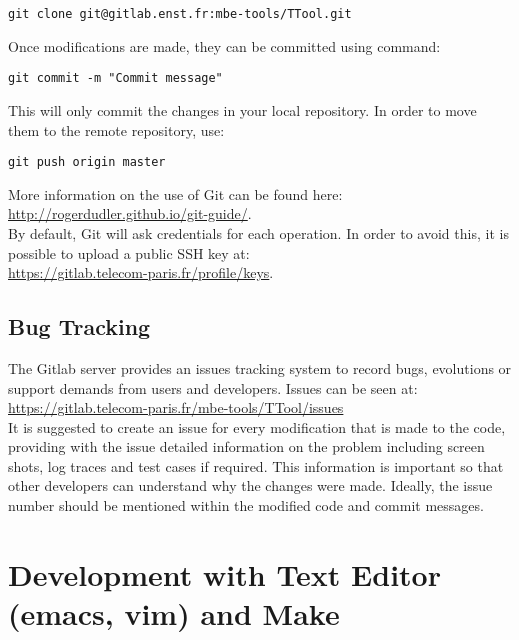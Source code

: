 \documentclass[12pt]{article}
\begin{document}
\begin{verbatim}
git clone git@gitlab.enst.fr:mbe-tools/TTool.git
\end{verbatim}

Once modifications are made, they can be committed using command:

\begin{verbatim}
git commit -m "Commit message"
\end{verbatim}

This will only commit the changes in your local repository. In order to move them to the remote repository, use:

\begin{verbatim}
git push origin master
\end{verbatim}

More information on the use of Git can be found here: \\
\url{http://rogerdudler.github.io/git-guide/}. \\

By default, Git will ask credentials for each operation. In order to avoid this,
it is possible to upload a public SSH key at: \\
\url{https://gitlab.telecom-paris.fr/profile/keys}.

\subsection{Bug Tracking}

The Gitlab server provides an issues tracking system to record bugs, evolutions
or support demands from users and developers. Issues can be seen at: \\
\url{https://gitlab.telecom-paris.fr/mbe-tools/TTool/issues} \\

It is suggested to create an issue for every modification that is made to the
code, providing with the issue detailed information on the problem including
screen shots, log traces and test cases if required. This information is
important so that other developers can understand why the changes were made.
Ideally, the issue number should be mentioned within the modified code and
commit messages.  \\

\section{Development with Text Editor (emacs, vim) and Make}
\end{document}
